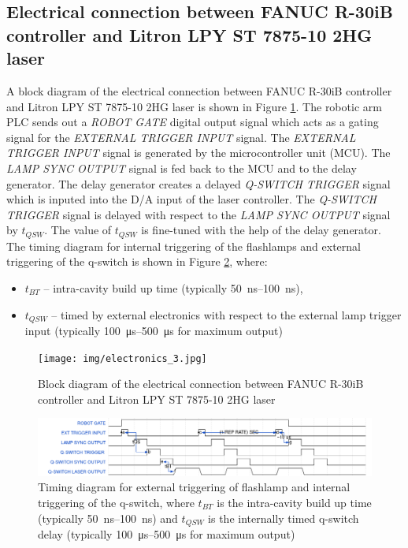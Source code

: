 \subsection{Electrical connection between FANUC R-30iB controller and Litron LPY ST 7875-10 2HG laser}
 \label{sec:electrical_connection}

A block diagram of the electrical connection between FANUC R-30iB controller and Litron LPY ST 7875-10 2HG laser is shown in Figure \ref{fig:electronics}. The robotic arm PLC sends out a \textit{ROBOT GATE} digital output signal which acts as a gating signal for the \textit{EXTERNAL TRIGGER INPUT} signal. The \textit{EXTERNAL TRIGGER INPUT} signal is generated by the microcontroller unit (MCU). The \textit{LAMP SYNC OUTPUT} signal is fed back to the MCU and to the delay generator. The delay generator creates a delayed \textit{Q-SWITCH TRIGGER} signal which is inputed into the D/A  input of the laser controller. The \textit{Q-SWITCH TRIGGER} signal is delayed with respect to the \textit{LAMP SYNC OUTPUT} signal by $t_{QSW}$. The value of $t_{QSW}$ is fine-tuned with the help of the delay generator.  The timing diagram for internal triggering of the flashlamps and external triggering of the q-switch is shown in Figure \ref{fig:wave}, where:

\begin{itemize}
    \item $t_{BT}$ -- intra-cavity build up time (typically \SIrange{50}{100}{\ns}),
    \item $t_{QSW}$ -- timed by external electronics with respect to the external lamp trigger input (typically \SIrange{100}{500}{\us} for maximum output)

\end{itemize}


\begin{figure}[h]
    \centering
    \texttt{[image: img/electronics\_3.jpg]}
    \caption{Block diagram of the electrical connection between FANUC R-30iB controller and Litron LPY ST 7875-10 2HG laser}
    \label{fig:electronics}
\end{figure}

\begin{figure}[h]
    \centering
    \includegraphics[width=1.0\linewidth]{img/wavedrom_bigger.png}
    \caption{Timing diagram for external triggering of flashlamp and internal triggering of the q-switch, where $t_{BT}$ is the intra-cavity build up time (typically \SIrange{50}{100}{\ns}) and $t_{QSW}$ is the internally timed q-switch delay (typically \SIrange{100}{500}{\us} for maximum output)}
    \label{fig:wave}
\end{figure}


